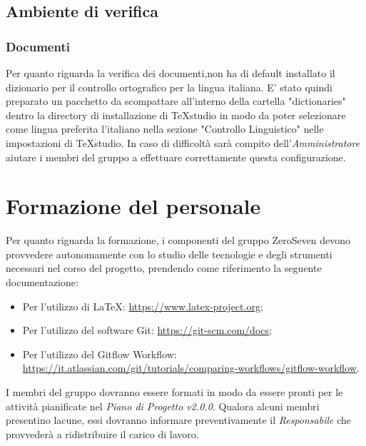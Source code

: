 \subsection{Ambiente di verifica}
\subsubsection{Documenti}
Per quanto riguarda la verifica dei documenti,non ha di default installato il dizionario per il controllo ortografico per la lingua italiana. E' stato quindi preparato un pacchetto da scompattare all'interno della cartella "dictionaries" dentro la directory di installazione di TeXstudio in modo da poter selezionare come lingua preferita l'italiano nella sezione "Controllo Linguistico" nelle impostazioni di TeXstudio.  In caso di difficoltà sarà compito dell'\textit{Amministratore} aiutare i membri del gruppo a effettuare correttamente questa configurazione.
\section{Formazione del personale}
Per quanto riguarda la formazione, i componenti del gruppo ZeroSeven devono provvedere autonomamente con lo studio delle tecnologie e degli strumenti necessari nel corso del progetto, prendendo come riferimento la seguente documentazione:
\begin{itemize}
	\item Per l'utilizzo di \LaTeX: \url{https://www.latex-project.org};
	\item Per l'utilizzo del software Git: \url{https://git-scm.com/docs};
	\item Per l'utilizzo del Gitflow Workflow: \url{https://it.atlassian.com/git/tutorials/comparing-workflows/gitflow-workflow}.
\end{itemize}
I membri del gruppo dovranno essere formati in modo da essere pronti per le attività pianificate nel \textit{Piano di Progetto v2.0.0}. Qualora alcuni membri presentino lacune, essi dovranno informare preventivamente il \textit{Responsabile} che provvederà a ridistribuire il carico di lavoro. 